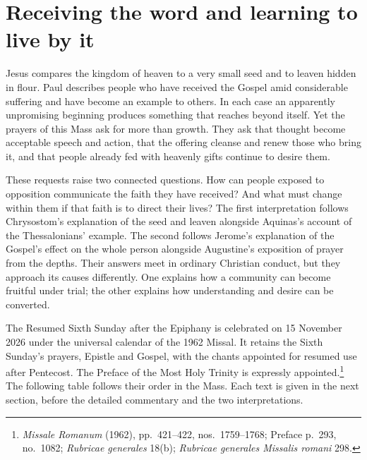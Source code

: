 \section{Receiving the word and learning to live by it}

Jesus compares the kingdom of heaven to a very small seed and to leaven hidden in flour. Paul describes people who have received the Gospel amid considerable suffering and have become an example to others. In each case an apparently unpromising beginning produces something that reaches beyond itself. Yet the prayers of this Mass ask for more than growth. They ask that thought become acceptable speech and action, that the offering cleanse and renew those who bring it, and that people already fed with heavenly gifts continue to desire them.

These requests raise two connected questions. How can people exposed to opposition communicate the faith they have received? And what must change within them if that faith is to direct their lives? The first interpretation follows Chrysostom's explanation of the seed and leaven alongside Aquinas's account of the Thessalonians' example. The second follows Jerome's explanation of the Gospel's effect on the whole person alongside Augustine's exposition of prayer from the depths. Their answers meet in ordinary Christian conduct, but they approach its causes differently. One explains how a community can become fruitful under trial; the other explains how understanding and desire can be converted.

The Resumed Sixth Sunday after the Epiphany is celebrated on 15 November 2026 under the universal calendar of the 1962 Missal. It retains the Sixth Sunday's prayers, Epistle and Gospel, with the chants appointed for resumed use after Pentecost. The Preface of the Most Holy Trinity is expressly appointed.\footnote{\textit{Missale Romanum} (1962), pp.~421--422, nos.~1759--1768; Preface p.~293, no.~1082; \textit{Rubricae generales} 18(b); \textit{Rubricae generales Missalis romani} 298.} The following table follows their order in the Mass. Each text is given in the next section, before the detailed commentary and the two interpretations.

